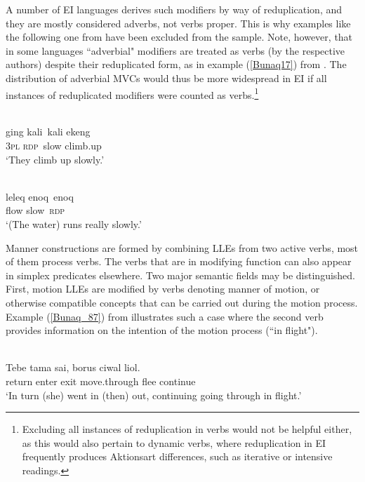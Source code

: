 A number of EI languages derives such modifiers by way of reduplication, and they are mostly considered adverbs, not verbs proper. This is why examples like the following one from  have been excluded from the sample. Note, however, that in some languages ``adverbial" modifiers are treated as verbs (by the respective authors) despite their reduplicated form, as in example (\ref{Bunaq17}) from . The distribution of adverbial MVCs would thus be more widespread in EI if all instances of reduplicated modifiers were counted as verbs.\footnote{Excluding all instances of reduplication in verbs would not be helpful either, as this would also pertain to dynamic verbs, where reduplication in EI frequently produces Aktionsart differences, such as iterative or intensive readings.}

\ea 
{}\\
\gll ging kali~kali ekeng \\
3\textsc{pl} \textsc{rdp}~slow climb.up \\
\glft `They climb up slowly.'\\ 
\z

\ea \label{Bunaq17}
\\
\gll leleq enoq~enoq \\
flow slow~\textsc{rdp} \\
\glft `(The water) runs really slowly.'\\ 
\z

Manner constructions are formed by combining LLEs from two active verbs, most of them process verbs. The verbs that are in modifying function can also appear in simplex predicates elsewhere. Two major semantic fields may be distinguished. First, motion LLEs are modified by verbs denoting manner of motion, or otherwise compatible concepts that can be carried out during the motion process. Example (\ref{Bunaq_87}) from  illustrates such a case where the second verb provides information on the intention of the motion process (``in flight"). 

\ea \label{Bunaq_87}
\\
\gll Tebe tama sai, borus ciwal liol. \\
return enter exit move.through flee continue \\
\glft `In turn (she) went in (then) out, continuing going through in flight.’\\ 
\z

